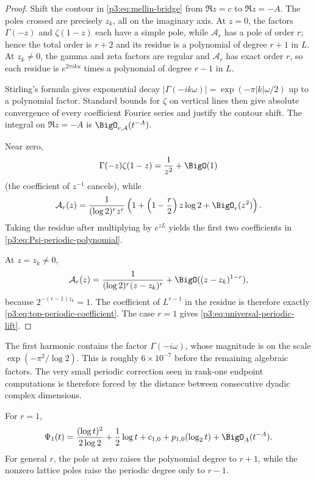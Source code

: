 \documentclass[11pt,oneside]{article}
\theoremstyle{definition}
\theoremstyle{remark}
\begin{document}
\begin{proof}
Shift the contour in \eqref{p3:eq:mellin-bridge} from $\Re z=c$ to $\Re z=-A$.  The poles crossed are precisely $z_k$, all on the imaginary axis.  At $z=0$, the factors $\Gamma(-z)$ and $\zeta(1-z)$ each have a simple pole, while $\mathcal A_r$ has a pole of order $r$; hence the total order is $r+2$ and its residue is a polynomial of degree $r+1$ in $L$.  At $z_k\ne0$, the gamma and zeta factors are regular and $\mathcal A_r$ has exact order $r$, so each residue is $e^{2\pi iku}$ times a polynomial of degree $r-1$ in $L$.

Stirling's formula gives exponential decay
$|\Gamma(-ik\omega)|=\exp(-\pi|k|\omega/2)$ up to a polynomial factor.  Standard bounds for $\zeta$ on vertical lines then give absolute convergence of every coefficient Fourier series and justify the contour shift.  The integral on $\Re z=-A$ is $\BigO_{r,A}(t^{-A})$.

Near zero,
\[
 \Gamma(-z)\zeta(1-z)=\frac1{z^2}+\BigO(1)
\]
(the coefficient of $z^{-1}$ cancels), while
\[
 \mathcal A_r(z)=\frac1{(\log2)^rz^r}
 \left(1+\left(1-\frac r2\right)z\log2+\BigO_r(z^2)\right).
\]
Taking the residue after multiplying by $e^{zL}$ yields the first two coefficients in \eqref{p3:eq:Psi-periodic-polynomial}.

At $z=z_k\ne0$,
\[
 \mathcal A_r(z)=\frac1{(\log2)^r(z-z_k)^r}
 +\BigO((z-z_k)^{1-r}),
\]
because $2^{-(r-1)z_k}=1$.  The coefficient of $L^{r-1}$ in the residue is therefore exactly \eqref{p3:eq:top-periodic-coefficient}.  The case $r=1$ gives \eqref{p3:eq:universal-periodic-lift}.
\end{proof}

\begin{remark}
The first harmonic contains the factor
$\Gamma(-i\omega)$, whose magnitude is on the scale
$\exp(-\pi^2/\log2)$.  This is roughly $6\times10^{-7}$ before the remaining algebraic factors.  The very small periodic correction seen in rank-one endpoint computations is therefore forced by the distance between consecutive dyadic complex dimensions.
\end{remark}

\begin{corollary}\label{p3:cor:rank-one-Psi}
For $r=1$,
\begin{equation}\label{p3:eq:rank-one-Psi}
 \Psi_1(t)=\frac{(\log t)^2}{2\log2}
 +\frac12\log t+c_{1,0}+p_{1,0}(\log_2t)
 +\BigO_A(t^{-A}).
\end{equation}
For general $r$, the pole at zero raises the polynomial degree to $r+1$, while the nonzero lattice poles raise the periodic degree only to $r-1$.
\end{corollary}
\end{document}
